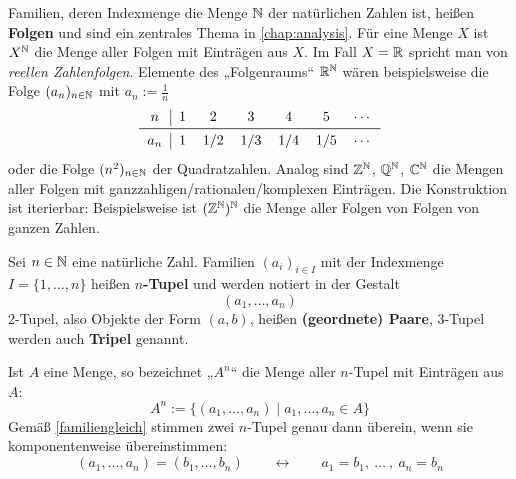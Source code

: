 \begin{bsp}[* Folgen]
    Familien, deren Indexmenge die Menge $\mathbb N$ der natürlichen Zahlen ist, heißen \textbf{Folgen} und sind ein zentrales Thema in \cref{chap:analysis}. Für eine Menge $X$ ist $X^\mathbb N$ die Menge aller Folgen mit Einträgen aus $X$. Im Fall $X=\mathbb R$ spricht man von \emph{reellen Zahlenfolgen}. Elemente des „Folgenraums“ $\mathbb R^\mathbb N$ wären beispielsweise die Folge $(a_n)_{n\in\mathbb N}$ mit $a_n:=\frac{1}{n}$
    \[\begin{tabular}{c|cccccc}
            $n$ & $1$ & $2$ & $3$ & $4$ & $5$ & $\cdots$ \\
            \midrule
            $a_n$ & $1$ & $1/2$ & $1/3$ & $1/4$ & $1/5$ & $\cdots$
    \end{tabular}\]
    oder die Folge $(n^2)_{n\in \mathbb N}$ der Quadratzahlen. Analog sind $\mathbb Z^\mathbb N$, $\mathbb Q^\mathbb N$, $\mathbb C^\mathbb N$ die Mengen aller Folgen mit ganzzahligen/rationalen/komplexen Einträgen. Die Konstruktion ist iterierbar: Beispielsweise ist $(\mathbb Z^\mathbb N)^\mathbb N$ die Menge aller Folgen von Folgen von ganzen Zahlen.
\end{bsp}


\begin{defin}[Tupel] \label{def:tupel} 
    Sei $n\in \mathbb N$ eine natürliche Zahl. Familien $(a_i)_{i\in I}$ mit der Indexmenge $I=\{1,\dots,n\}$ heißen \textbf{$n$-Tupel} und werden notiert in der Gestalt
        \[ (a_1,\dots,a_n)  \]
    2-Tupel, also Objekte der Form $(a,b)$, heißen \textbf{(geordnete) Paare}, 3-Tupel werden auch \textbf{Tripel} genannt.
    
    Ist $A$ eine Menge, so bezeichnet „$A^n$“ die Menge aller $n$-Tupel mit Einträgen aus $A$:
        \[ A^n := \{ (a_1,\dots , a_n) \mid a_1,\dots , a_n \in A \} \]
    Gemäß \cref{familiengleich} stimmen zwei $n$-Tupel genau dann überein, wenn sie komponentenweise übereinstimmen:
	\[ (a_1,\dots , a_n)=(b_1,\dots , b_n) \qquad\leftrightarrow\qquad a_1=b_1,\ \ldots\ ,\ a_n=b_n \]
\end{defin}


